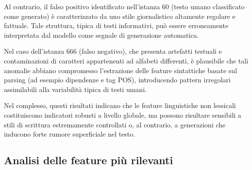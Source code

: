 \documentclass{article}
\begin{document}
Al contrario, il falso positivo identificato nell’istanza 60 (testo umano classificato come generato) è caratterizzato da uno stile giornalistico altamente regolare e fattuale. Tale struttura, tipica di testi informativi, può essere erroneamente interpretata dal modello come segnale di generazione automatica.

Nel caso dell’istanza 666 (falso negativo), che presenta artefatti testuali e contaminazioni di caratteri appartenenti ad alfabeti differenti, è plausibile che tali anomalie abbiano compromesso l’estrazione delle feature sintattiche basate sul parsing (ad esempio dipendenze e tag POS), introducendo pattern irregolari assimilabili alla variabilità tipica di testi umani.

Nel complesso, questi risultati indicano che le feature linguistiche non lessicali costituiscono indicatori robusti a livello globale, ma possono risultare sensibili a stili di scrittura estremamente controllati o, al contrario, a generazioni che inducono forte rumore superficiale nel testo.

\subsection{Analisi delle feature più rilevanti}
\end{document}
